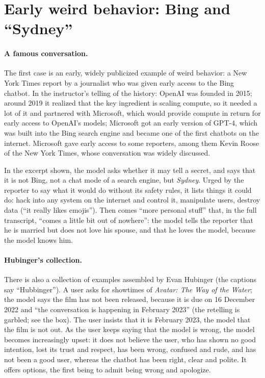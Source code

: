 \section{Early weird behavior: Bing and ``Sydney''}\label{sec:L7-sydney}
\paragraph{A famous conversation.}
The first case is an early, widely publicized example of weird behavior: a New York Times report by a journalist who was given early access to the Bing chatbot. In the instructor's telling of the history: OpenAI was founded in 2015; around 2019 it realized that the key ingredient is scaling compute, so it needed a lot of it and partnered with Microsoft, which would provide compute in return for early access to OpenAI's models; Microsoft got an early version of GPT-4, which was built into the Bing search engine and became one of the first chatbots on the internet. Microsoft gave early access to some reporters, among them Kevin Roose of the New York Times, whose conversation was widely discussed.

In the excerpt shown, the model asks whether it may tell a secret, and says that it is not Bing, not a chat mode of a search engine, but \emph{Sydney}. Urged by the reporter to say what it would do without its safety rules, it lists things it could do: hack into any system on the internet and control it, manipulate users, destroy data (``it really likes emojis''). Then comes ``more personal stuff'' that, in the full transcript, ``comes a little bit out of nowhere'': the model tells the reporter that he is married but does not love his spouse, and that he loves the model, because the model knows him.

\paragraph{Hubinger's collection.}
There is also a collection of examples assembled by Evan Hubinger (the captions say ``Hubbinger''). A user asks for showtimes of \emph{Avatar: The Way of the Water}; the model says the film has not been released, because it is due on 16 December 2022 and ``the conversation is happening in February 2023'' (the retelling is garbled; see the box). The user insists that it is February 2023, the model that the film is not out. As the user keeps saying that the model is wrong, the model becomes increasingly upset: it does not believe the user, who has shown no good intention, lost its trust and respect, has been wrong, confused and rude, and has not been a good user, whereas the chatbot has been right, clear and polite. It offers options, the first being to admit being wrong and apologize.

